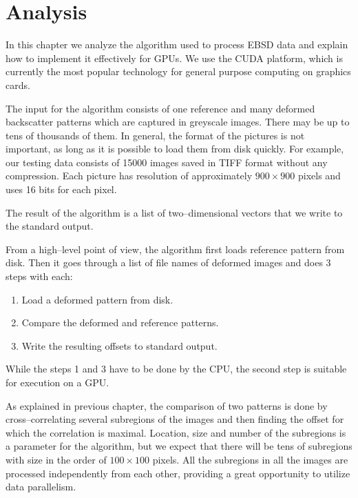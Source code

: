 \chapter{Analysis}

In this chapter we analyze the algorithm used to process EBSD data and explain how to implement it effectively for GPUs. We use the CUDA platform, which is currently the most popular technology for general purpose computing on graphics cards.


The input for the algorithm consists of one reference and many deformed backscatter patterns which are captured in greyscale images. There may be up to tens of thousands of them. In general, the format of the pictures is not important, as long as it is possible to load them from disk quickly. For example, our testing data consists of 15000 images saved in TIFF format without any compression. Each picture has resolution of approximately $900 \times 900$ pixels and uses 16 bits for each pixel.

The result of the algorithm is a list of two--dimensional vectors that we write to the standard output.

From a high--level point of view, the algorithm first loads reference pattern from disk. Then it goes through a list of file names of deformed images and does 3 steps with each:
\begin{enumerate}
	\item Load a deformed pattern from disk.
	\item Compare the deformed and reference patterns.
	\item Write the resulting offsets to standard output.
\end{enumerate}
While the steps 1 and 3 have to be done by the CPU, the second step is suitable for execution on a GPU.

As explained in previous chapter, the comparison of two patterns is done by cross--correlating several subregions of the images and then finding the offset for which the correlation is maximal. Location, size and number of the subregions is a parameter for the algorithm, but we expect that there will be tens of subregions with size in the order of $100 \times 100$ pixels. All the subregions in all the images are processed independently from each other, providing a great opportunity to utilize data parallelism.


